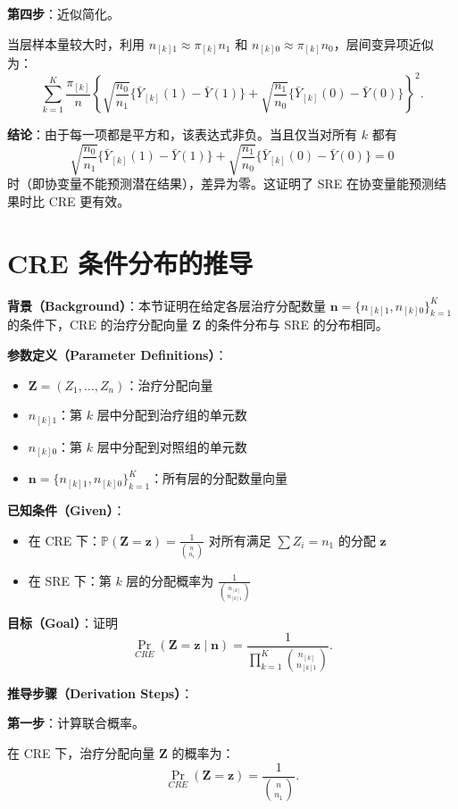 \textbf{第四步}：近似简化。

当层样本量较大时，利用 $n_{[k]1} \approx \pi_{[k]} n_1$ 和 $n_{[k]0} \approx \pi_{[k]} n_0$，层间变异项近似为：
\[
\sum_{k=1}^K \frac{\pi_{[k]}}{n} \left\{ \sqrt{\frac{n_0}{n_1}} \{\bar{Y}_{[k]}(1) - \bar{Y}(1)\} + \sqrt{\frac{n_1}{n_0}} \{\bar{Y}_{[k]}(0) - \bar{Y}(0)\} \right\}^2.
\]

\textbf{结论}：由于每一项都是平方和，该表达式非负。当且仅当对所有 $k$ 都有
\[
\sqrt{\frac{n_0}{n_1}} \{\bar{Y}_{[k]}(1) - \bar{Y}(1)\} + \sqrt{\frac{n_1}{n_0}} \{\bar{Y}_{[k]}(0) - \bar{Y}(0)\} = 0
\]
时（即协变量不能预测潜在结果），差异为零。这证明了 SRE 在协变量能预测结果时比 CRE 更有效。

\section{CRE 条件分布的推导}\label{sec:appendix-5-5}

\textbf{背景（Background）}：本节证明在给定各层治疗分配数量 $\mathbf{n} = \{n_{[k]1}, n_{[k]0}\}_{k=1}^K$ 的条件下，CRE 的治疗分配向量 $\mathbf{Z}$ 的条件分布与 SRE 的分布相同。

\textbf{参数定义（Parameter Definitions）}：
\begin{itemize}
  \item $\mathbf{Z} = (Z_1, \ldots, Z_n)$：治疗分配向量
  \item $n_{[k]1}$：第 $k$ 层中分配到治疗组的单元数
  \item $n_{[k]0}$：第 $k$ 层中分配到对照组的单元数
  \item $\mathbf{n} = \{n_{[k]1}, n_{[k]0}\}_{k=1}^K$：所有层的分配数量向量
\end{itemize}

\textbf{已知条件（Given）}：
\begin{itemize}
  \item 在 CRE 下：$\mathbb{P}(\mathbf{Z} = \mathbf{z}) = \frac{1}{\binom{n}{n_1}}$ 对所有满足 $\sum Z_i = n_1$ 的分配 $\mathbf{z}$
  \item 在 SRE 下：第 $k$ 层的分配概率为 $\frac{1}{\binom{n_{[k]}}{n_{[k]1}}}$
\end{itemize}

\textbf{目标（Goal）}：证明
\[
\Pr_{CRE}(\mathbf{Z} = \mathbf{z} \mid \mathbf{n}) = \frac{1}{\prod_{k=1}^K \binom{n_{[k]}}{n_{[k]1}}}.
\]

\textbf{推导步骤（Derivation Steps）}：

\textbf{第一步}：计算联合概率。

在 CRE 下，治疗分配向量 $\mathbf{Z}$ 的概率为：
\[
\Pr_{CRE}(\mathbf{Z} = \mathbf{z}) = \frac{1}{\binom{n}{n_1}}.
\]

